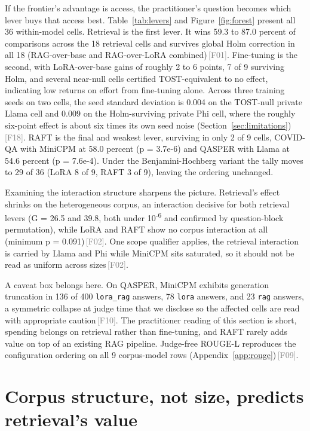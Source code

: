 \documentclass[11pt]{article}
\newcommand{\rcpt}[1]{\textcolor{gray}{\,\textsf{\scriptsize[#1]}}}
\begin{document}
If the frontier's advantage is access, the practitioner's question becomes which lever buys that access best. Table~\ref{tab:levers} and Figure~\ref{fig:forest} present all 36 within-model cells. Retrieval is the first lever. It wins 59.3 to 87.0 percent of comparisons across the 18 retrieval cells and survives global Holm correction in all 18 (RAG-over-base and RAG-over-LoRA combined)\rcpt{F01}. Fine-tuning is the second, with LoRA-over-base gains of roughly 2 to 6 points, 7 of 9 surviving Holm, and several near-null cells certified TOST-equivalent to no effect, indicating low returns on effort from fine-tuning alone. Across three training seeds on two cells, the seed standard deviation is 0.004 on the TOST-null private Llama cell and 0.009 on the Holm-surviving private Phi cell, where the roughly six-point effect is about six times its own seed noise (Section~\ref{sec:limitations})\rcpt{F18}. RAFT is the final and weakest lever, surviving in only 2 of 9 cells, COVID-QA with MiniCPM at 58.0 percent (p = 3.7e-6) and QASPER with Llama at 54.6 percent (p = 7.6e-4). Under the Benjamini-Hochberg variant the tally moves to 29 of 36 (LoRA 8 of 9, RAFT 3 of 9), leaving the ordering unchanged.

Examining the interaction structure sharpens the picture. Retrieval's effect shrinks on the heterogeneous corpus, an interaction decisive for both retrieval levers (G = 26.5 and 39.8, both under 10\textsuperscript{-6} and confirmed by question-block permutation), while LoRA and RAFT show no corpus interaction at all (minimum p = 0.091)\rcpt{F02}. One scope qualifier applies, the retrieval interaction is carried by Llama and Phi while MiniCPM sits saturated, so it should not be read as uniform across sizes\rcpt{F02}.

A caveat box belongs here. On QASPER, MiniCPM exhibits generation truncation in 136 of 400 \texttt{lora\_rag} answers, 78 \texttt{lora} answers, and 23 \texttt{rag} answers, a symmetric collapse at judge time that we disclose so the affected cells are read with appropriate caution\rcpt{F10}. The practitioner reading of this section is short, spending belongs on retrieval rather than fine-tuning, and RAFT rarely adds value on top of an existing RAG pipeline. Judge-free ROUGE-L reproduces the configuration ordering on all 9 corpus-model rows (Appendix~\ref{app:rouge})\rcpt{F09}.

\section{Corpus structure, not size, predicts retrieval's value}
\label{sec:mechanism}
\end{document}
